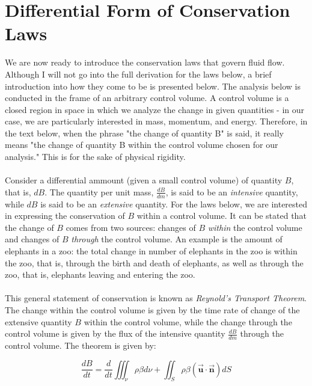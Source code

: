 \documentclass[11pt]{article}
\begin{document}
\pagebreak

\section{Differential Form of Conservation Laws}
We are now ready to introduce the conservation laws that govern fluid flow. Although I will not go into the full derivation for the laws below, a brief introduction into how they come to be is presented below. The analysis below is conducted in the frame of an arbitrary control volume. A control volume is a closed region in space in which we analyze the change in given quantities - in our case, we are particularly interested in mass, momentum, and energy. Therefore, in the text below, when the phrase "the change of quantity B" is said, it really means "the change of quantity B within the control volume chosen for our analysis." This is for the sake of physical rigidity.\\ \\
\noindent
Consider a differential ammount (given a small control volume) of quantity $B$, that is, $dB$. The quantity per unit mass, $\frac{dB}{dm}$, is said to be an \emph{intensive} quantity, while $dB$ is said to be an \emph{extensive} quantity. For the laws below, we are interested in expressing the conservation of $B$ within a control volume. It can be stated that the change of $B$ comes from two sources: changes of $B$ \emph{within} the control volume and changes of $B$ \emph{through} the control volume. An example is the amount of elephants in a zoo: the total change in number of elephants in the zoo is within the zoo, that is, through the birth and death of elephants, as well as through the zoo, that is, elephants leaving and entering the zoo.\\ \\
\noindent
This general statement of conservation is known as \emph{Reynold's Transport Theorem}. The change within the control volume is given by the time rate of change of the extensive quantity $B$ within the control volume, while the change through the control volume is given by the flux of the intensive quantity $\frac{dB}{dm}$ through the control volume. The theorem is given by:

\begin{equation*}
    \frac{dB}{dt} = \frac{d}{dt}\iiint_{\nu}\rho \beta d\nu + \iint_{S}\rho\beta (\vec{\bm{u}} \cdot \vec{\bm{n}}) dS
\end{equation*} \\
\end{document}
